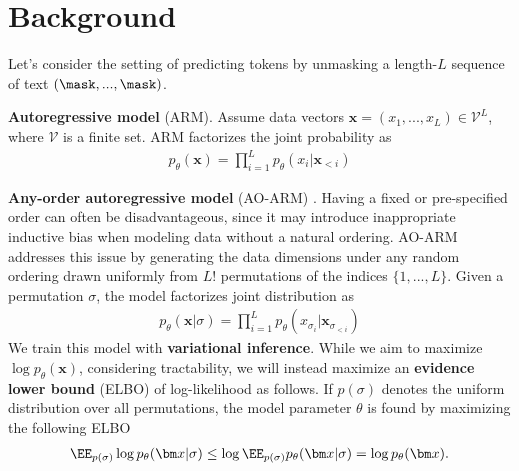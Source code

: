 \section{Background}
Let's consider the setting of predicting tokens by unmasking a length-$L$ sequence of text $(\mask,...,\mask)$.

\textbf{Autoregressive model} (ARM). Assume data vectors $\bm x=(x_1,...,x_L)\in\mathcal V^L$, where $\mathcal V$ is a finite set. ARM factorizes the joint probability as
\begin{align*}
    p_\theta(\bm x)=\prod_{i=1}^Lp_\theta(x_i|\bm x_{<i})
\end{align*}

\textbf{Any-order autoregressive model} (AO-ARM) \citep{uria14deep,hoogeboom2022autoregressive}. Having a fixed or pre-specified order can often be disadvantageous, since it may introduce inappropriate inductive bias when modeling data without a natural ordering. AO-ARM addresses this issue by generating the data dimensions under any random ordering drawn uniformly from $L!$ permutations of the indices $\{1,...,L\}$. Given a permutation $\sigma$, the model factorizes joint distribution as
\begin{align*}
    p_\theta(\bm x|\sigma)=\prod_{i=1}^Lp_\theta(x_{\sigma_i}|\bm x_{\sigma_{<i}})
\end{align*}
We train this model with \textbf{variational inference}. While we aim to maximize $\log p_\theta(\bm x)$, considering tractability, we will instead maximize an \textbf{evidence lower bound} (ELBO) of log-likelihood as follows. If $p(\sigma)$ denotes the uniform distribution over all permutations, the model parameter $\theta$ is found by maximizing the following ELBO
\begin{align*}
    \EE_{p(\sigma)}\log p_\theta(\bm x|\sigma)\leq\log\EE_{p(\sigma)} p_\theta(\bm x|\sigma)=\log p_\theta(\bm x).
\end{align*}

